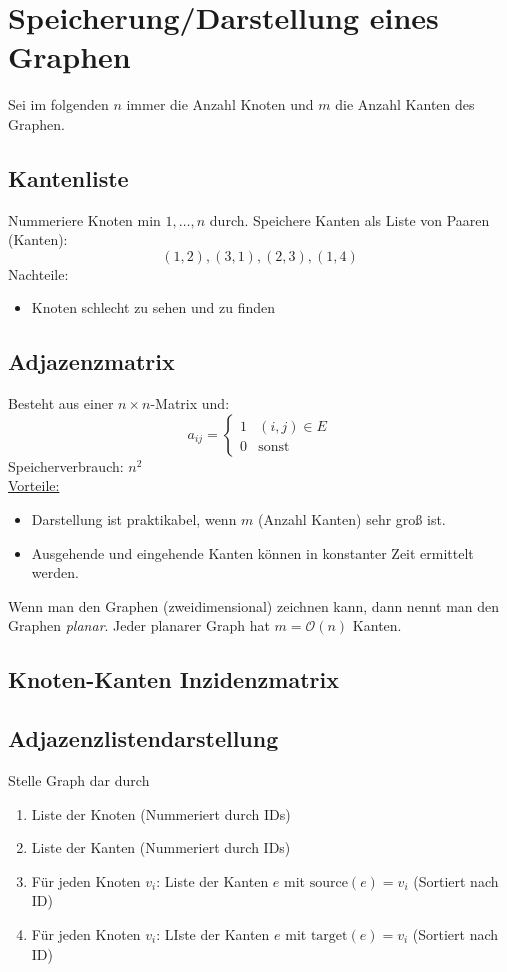\documentclass{mycourse}
\begin{document}
\section{Speicherung/Darstellung eines Graphen}
Sei im folgenden $n$ immer die Anzahl Knoten und $m$ die Anzahl Kanten des Graphen.

\subsection{Kantenliste}
Nummeriere Knoten min $1,\dotsc,n$ durch.
Speichere Kanten als Liste von Paaren (Kanten):
\[
(1,2), (3,1), (2,3), (1,4)
\]
Nachteile:
\begin{itemize}
\item Knoten schlecht zu sehen und zu finden
\end{itemize}
\subsection{Adjazenzmatrix}
Besteht aus einer $n\times n$-Matrix und:
\[
a_{ij} = \begin{cases}
1&(i,j)\in E\\
0& \text{sonst}
\end{cases}
\]
Speicherverbrauch: $n^2$\\
\underline{Vorteile:}
\begin{itemize}
\item Darstellung ist praktikabel, wenn $m$ (Anzahl Kanten) sehr groß ist.
\item Ausgehende und eingehende Kanten können in konstanter Zeit ermittelt werden.
\end{itemize}

\begin{note}
Wenn man den Graphen (zweidimensional) zeichnen kann, dann nennt man den Graphen \emph{planar}.
Jeder planarer Graph hat $m=\mathcal O(n)$ Kanten.
\end{note}

\subsection{Knoten-Kanten Inzidenzmatrix}

\subsection{Adjazenzlistendarstellung}
Stelle Graph dar durch
\begin{enumerate}
\item Liste der Knoten (Nummeriert durch IDs)
\item Liste der Kanten (Nummeriert durch IDs)
\item Für jeden Knoten $v_i$: Liste der Kanten $e$ mit $\text{source}(e)=v_i$ (Sortiert nach ID)
\item Für jeden Knoten $v_i$: LIste der Kanten $e$ mit $\text{target}(e)=v_i$ (Sortiert nach ID)
\end{enumerate}
\end{document}
